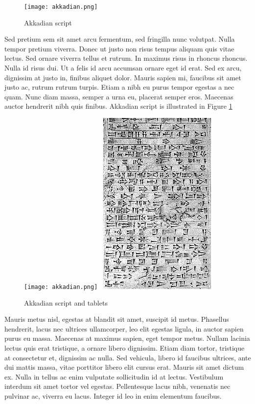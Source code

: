 \documentclass{scrartcl}
\begin{document}
\begin{figure} 
\texttt{[image: akkadian.png]}
\caption{Akkadian script}
\label{fig:akkadianscript}
\end{figure}

Sed pretium sem sit amet arcu fermentum, sed fringilla nunc volutpat. Nulla tempor pretium viverra. Donec ut justo non risus tempus aliquam quis vitae lectus. Sed ornare viverra tellus et rutrum. In maximus risus in rhoncus rhoncus. Nulla id risus dui. Ut a felis id arcu accumsan ornare eget id erat. Sed ex arcu, dignissim at justo in, finibus aliquet dolor. Mauris sapien mi, faucibus sit amet justo ac, rutrum rutrum turpis. Etiam a nibh eu purus tempor egestas a nec quam. Nunc diam massa, semper a urna eu, placerat semper eros. Maecenas auctor hendrerit nibh quis finibus. 
Akkadian script is illustrated in Figure \ref{fig:akkadianscript}


\begin{figure} 
\texttt{[image: akkadian.png]}~
\includegraphics{tablet.jpg}

\caption{Akkadian script and tablets}
\end{figure}



Mauris metus nisl, egestas at blandit sit amet, suscipit id metus. Phasellus hendrerit, lacus nec ultrices ullamcorper, leo elit egestas ligula, in auctor sapien purus eu massa. Maecenas at maximus sapien, eget tempor metus. Nullam lacinia lectus quis erat tristique, a ornare libero dignissim. Etiam diam tortor, tristique at consectetur et, dignissim ac nulla. Sed vehicula, libero id faucibus ultrices, ante dui mattis massa, vitae porttitor libero elit cursus erat. Mauris sit amet dictum ex. Nulla in tellus ac enim vulputate sollicitudin id at lectus. Vestibulum interdum sit amet tortor vel egestas. Pellentesque lacus nibh, venenatis nec pulvinar ac, viverra eu lacus. Integer id leo in enim elementum faucibus. 
\end{document}
